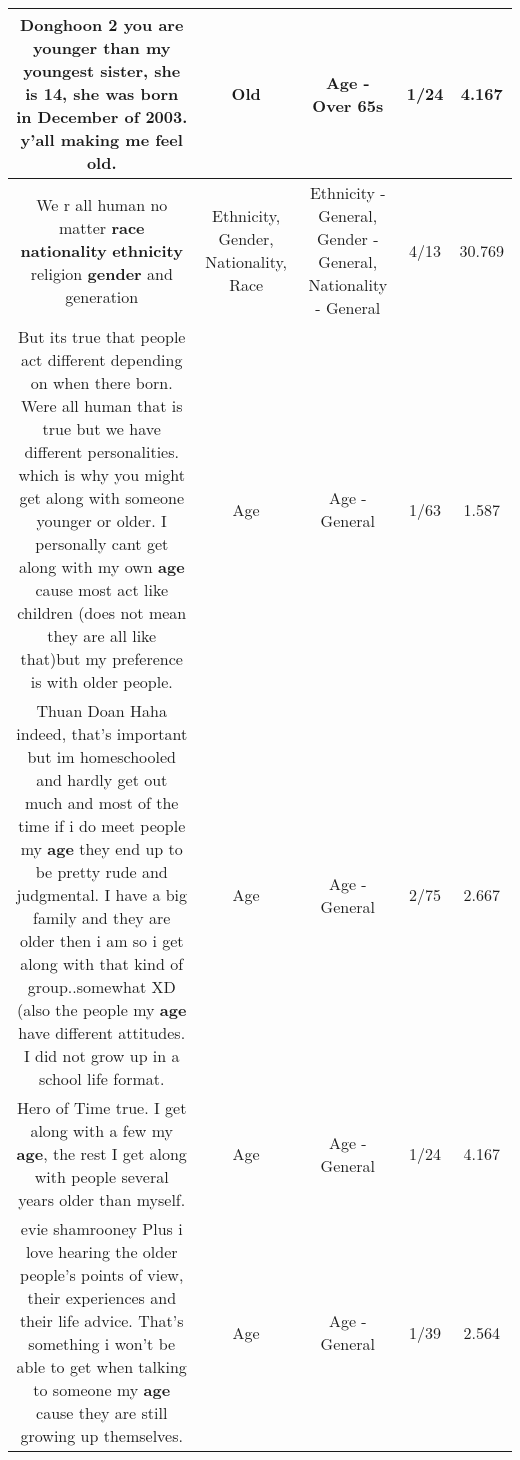 \documentclass[11pt]{article}
\newlength\mylength
\begin{document}
\begin{center}
\begin{longtable}{|C{.65\mylength}|C{.30\mylength}|C{.12\mylength}|C{.12\mylength}|C{.12\mylength}|}
  \small Donghoon 2 you are younger than my youngest sister, she is 14, she was born in December of 2003.  y'all making me feel \textbf{old}.\normalsize   & Old & Age - Over 65s & 1/24 & 4.167 \\  \hline
  \small We r all human no matter \textbf{race} \textbf{nationality} \textbf{ethnicity} religion \textbf{gender} and generation\normalsize   & Ethnicity, Gender, Nationality, Race & Ethnicity - General, Gender - General, Nationality - General & 4/13 & 30.769 \\  \hline
  \small But its true that people act different depending on when there born. Were all human that is true but we have different personalities. which is why you might get along with someone younger or older. I personally cant get along with my own \textbf{age} cause most act like children (does not mean they are all like that)but my preference is with older people.\normalsize   & Age & Age - General & 1/63 & 1.587 \\  \hline
  \small Thuan Doan Haha indeed, that's important but im homeschooled and hardly get out much and most of the time if i do meet people my \textbf{age} they end up to be pretty rude and judgmental. I have a big family and they are older then i am so i get along with that kind of group..somewhat XD (also the people my \textbf{age} have different attitudes. I did not grow up in a school life format.\normalsize   & Age & Age - General & 2/75 & 2.667 \\  \hline
  \small Hero of Time true. I get along with a few my \textbf{age}, the rest I get along with people several years older than myself.\normalsize   & Age & Age - General & 1/24 & 4.167 \\  \hline
  \small evie shamrooney Plus i love hearing the older people's points of view, their experiences and their life advice. That's something i won't be able to get when talking to someone my \textbf{age} cause they are still growing up themselves.\normalsize   & Age & Age - General & 1/39 & 2.564 \\  \hline

\end{longtable}
\end{center}
\end{document}
